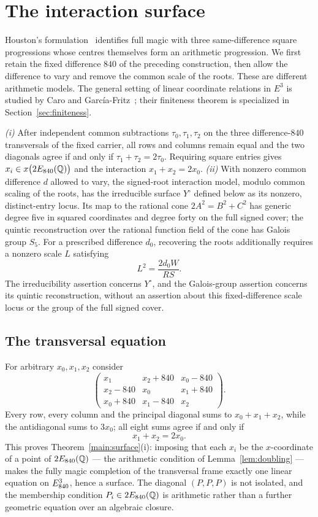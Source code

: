 
\section{The interaction surface}\label{sec:surface}

Houston's formulation~\cite{HOU16B} identifies full magic with three
same-difference square progressions whose centres themselves form an
arithmetic progression. We first retain the fixed difference $840$ of the
preceding construction, then allow the difference to vary and remove the
common scale of the roots. These are different arithmetic models. The
general setting of linear coordinate relations in $E^3$ is studied by Caro
and Garc\'ia-Fritz~\cite{CGF25}; their finiteness theorem is specialized in
Section~\ref{sec:finiteness}.

\begin{theorem}\label{main:surface}
\emph{(i)} After independent common subtractions $\tau_0,\tau_1,\tau_2$ on
the three difference-$840$ transversals of the fixed carrier, all rows and
columns remain equal and the two diagonals agree if and only if
$\tau_1+\tau_2=2\tau_0$. Requiring square entries gives
$x_i\in x\bigl(2E_{840}(\mathbb{Q})\bigr)$ and the interaction $x_1+x_2=2x_0$.
\emph{(ii)} With nonzero common difference $d$ allowed to vary, the
signed-root interaction model, modulo common scaling of the roots, has
the irreducible surface $Y^\circ$ defined below as its nonzero,
distinct-entry locus. Its map to the rational cone $2A^2=B^2+C^2$ has
generic degree five in squared coordinates and degree forty on the full
signed cover; the quintic reconstruction over the rational function field
of the cone has Galois group $S_5$.
For a prescribed difference $d_0$, recovering the roots additionally
requires a nonzero scale $L$ satisfying
\[
L^2=\frac{2d_0W}{RS}.
\]
The irreducibility assertion concerns $Y^\circ$, and the Galois-group
assertion concerns its quintic reconstruction, without an assertion about
this fixed-difference scale locus or the group of the full signed cover.
\end{theorem}

\subsection{The transversal equation}

For arbitrary $x_0,x_1,x_2$ consider
\[
\begin{pmatrix}
x_1 & x_2+840 & x_0-840\\
x_2-840 & x_0 & x_1+840\\
x_0+840 & x_1-840 & x_2
\end{pmatrix}.
\]
Every row, every column and the principal diagonal sums to $x_0+x_1+x_2$,
while the antidiagonal sums to $3x_0$; all eight sums agree if and only if
\[
x_1+x_2=2x_0 .
\]
This proves Theorem~\ref{main:surface}(i): imposing that each $x_i$ be the
$x$-coordinate of a point of $2E_{840}(\mathbb{Q})$ --- the arithmetic condition of
Lemma~\ref{lem:doubling} --- makes the fully magic completion of the
transversal frame exactly one linear equation on $E_{840}^{3}$, hence a
surface. The diagonal $(P,P,P)$ is not isolated, and the membership
condition $P_i\in2E_{840}(\mathbb{Q})$ is arithmetic rather than a further geometric
equation over an algebraic closure.

